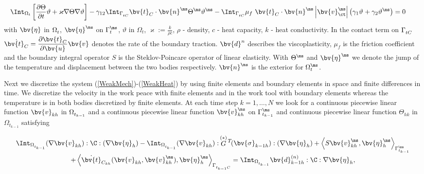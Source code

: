 \begin{equation}\label{WeakHeat}
\begin{array}{c}
\begin{array}{l}
 \displaystyle\hspace{-0.5cm}\Int_{\Omega_t}\left[\frac{\partial \Theta}{\partial t} \vartheta  +\varkappa  \nabla \Theta\nabla \vartheta\right]    -\gamma_{12} \Int_{\Gamma_{tC}^{\sl}}\bv{t}_{C}\cdot \bv{n}^{\ms} \Theta^{\ms \sl}\vartheta^{\ms \sl} - \Int_{\Gamma^{\sl}_{tC}}\mu_f~ \bv{t}_{C}\cdot \bv{n}^{\ms} \left| \bv{v}^{\ms \sl}_{\ct}\right|\left(\gamma_{1}\vartheta^{\sl}+\gamma_{2}\vartheta^{\ms}\right)=0
\end{array}
\end{array}
\end{equation}
with $\bv{\eta}^{\sl}$  in $\Omega_t^{\sl}$,  $\bv{\eta}^{\ms}$ on $\Gamma_t^{\ms}$, $\vartheta$ in  $\Omega_t$, $\varkappa:=\frac{k}{\rho c}$, $\rho$ - density, $c$ - heat  capacity, $k$ - heat conductivity.   In the contact term on $\Gamma^{\sl}_{tC}$ $\dot{\bv{t}_{C}}=\dfrac{\partial \bv{t}_{C}}{\partial \bv{u}} \bv{v}$ denotes the rate of the boundary traction. $\bv{d}^n$  describes the viscoplasticity, $\mu_f$ is the friction coefficient and the boundary integral operator $S$ is the Steklov-Poincare operator of linear elasticity. With $\Theta^{\ms \sl}$ and  $\bv{\eta}^{\ms \sl}$ we denote the jump of the temperature and displacement between the two bodies respectively. $\bv{n}^{\ms}$ is the exterior for $\Omega^{\ms}_t$.

Next we discretize the system  (\ref{WeakMech})-(\ref{WeakHeat}) by using finite elements and boundary elements in space and finite differences in time. We discretize the velocity in the work peace with finite elements and in the work tool with boundary elements whereas the temperature is in both bodies discretized by finite elements. At each time step $k=1,\ldots,N$ we look for a continuous piecewise linear function  $\bv{v}^{\sl}_{kh}$ in $\Omega^{\sl}_{t_{k-1}}$ and a  continuous piecewise linear function $\bv{v}^{\ms}_{kh}$ on $\Gamma^{\ms}_{t_{k-1}}$ and continuous piecewise linear function $\Theta_{hk}$ in $\Omega_{t_{k-1}}$ satisfying

\begin{equation}\label{DiscrWeakMech}
\begin{array}{c}
\begin{array}{l}
\displaystyle\Int_{\Omega_{t_{k-1}}^{\sl}}(\nabla \bv{v}_{kh}^{\sl}):\C:(\nabla \bv{\eta}_h^{\sl}) - \Int_{\Omega_{t_{k-1}}^{\sl}}(\nabla \bv{v}_{kh}^{\sl}): \,\stackrel{(*)}{G}\!{}^T\!(\bv{\sigma}_{{k-1}h}):(\nabla \bv{\eta}_h^{\sl})+\left\langle S \bv{v}_{kh}^{\ms},\bv{\eta}_h^{\ms}\right\rangle_{\Gamma^{\ms}_{t_{k-1}}} 
\end{array}
  \\ [2ex]
\begin{array}{r}
\displaystyle+\left\langle\dot{\bv{t}}_{C_{kh}} (\bv{v}_{kh}^{\sl},\bv{v}_{kh}^{\ms}), \bv{\eta}_h^{\sl \ms}\right\rangle_{\Gamma^{\sl}_{t_{k-1}C}}
=\Int_{\Omega_{t_{k-1}}^{\sl}}\bv{d}_{k-1h}^{(n)}  : \C : \nabla \bv{\eta}_h^{\sl},
\end{array}
\end{array}
\end{equation}

